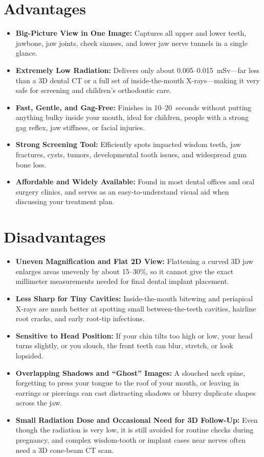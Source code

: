 \section{Advantages}
\begin{itemize}
\item \textbf{Big-Picture View in One Image:} Captures all upper and lower teeth, jawbone, jaw joints, cheek sinuses, and lower jaw nerve tunnels in a single glance.
\item \textbf{Extremely Low Radiation:} Delivers only about 0.005--0.015~mSv---far less than a 3D dental CT or a full set of inside-the-mouth X-rays---making it very safe for screening and children's orthodontic care.
\item \textbf{Fast, Gentle, and Gag-Free:} Finishes in 10--20~seconds without putting anything bulky inside your mouth, ideal for children, people with a strong gag reflex, jaw stiffness, or facial injuries.
\item \textbf{Strong Screening Tool:} Efficiently spots impacted wisdom teeth, jaw fractures, cysts, tumors, developmental tooth issues, and widespread gum bone loss.
\item \textbf{Affordable and Widely Available:} Found in most dental offices and oral surgery clinics, and serves as an easy-to-understand visual aid when discussing your treatment plan.
\end{itemize}

\section{Disadvantages}
\begin{itemize}
\item \textbf{Uneven Magnification and Flat 2D View:} Flattening a curved 3D jaw enlarges areas unevenly by about 15--30\%, so it cannot give the exact millimeter measurements needed for final dental implant placement.
\item \textbf{Less Sharp for Tiny Cavities:} Inside-the-mouth bitewing and periapical X-rays are much better at spotting small between-the-teeth cavities, hairline root cracks, and early root-tip infections.
\item \textbf{Sensitive to Head Position:} If your chin tilts too high or low, your head turns slightly, or you slouch, the front teeth can blur, stretch, or look lopsided.
\item \textbf{Overlapping Shadows and ``Ghost'' Images:} A slouched neck spine, forgetting to press your tongue to the roof of your mouth, or leaving in earrings or piercings can cast distracting shadows or blurry duplicate shapes across the jaw.
\item \textbf{Small Radiation Dose and Occasional Need for 3D Follow-Up:} Even though the radiation is very low, it is still avoided for routine checks during pregnancy, and complex wisdom-tooth or implant cases near nerves often need a 3D cone-beam CT scan.
\end{itemize}

